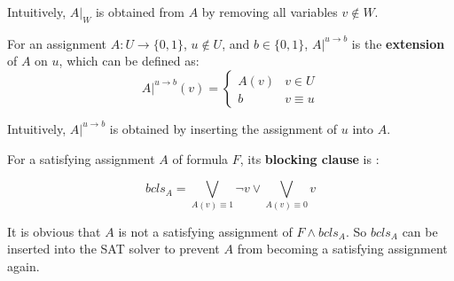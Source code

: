 \documentclass[journal]{IEEEtran}
\begin{document}
Intuitively, $A|_W$ is obtained from $A$ by removing all variables $v\notin W$.

For an assignment $A:U\to \{0,1\}$,
$u\notin U$,
and $b\in \{0,1\}$, $A|^{u\to b}$ is the \textbf{extension} of $A$ on $u$,
which can be defined as:
\begin{displaymath}
A|^{u\to b}(v) = \left\{ \begin{array}{ll}
A(v) & v\in U \\
b & v\equiv u
\end{array}
\right.
\end{displaymath}

Intuitively, $A|^{u\to b}$ is obtained by inserting the assignment of $u$ into $A$.



For a satisfying assignment $A$ of formula $F$,
its \textbf{blocking clause} is :

\begin{equation}\label{BCLS}
bcls_A=\bigvee _{A(v)\equiv 1}\neg v\vee \bigvee _{A(v)\equiv 0}v
\end{equation}

It is obvious that $A$ is not a satisfying assignment of $F\wedge bcls_A$.
So $bcls_A$ can be inserted into the SAT solver to prevent $A$ from becoming a satisfying assignment again.
\end{document}
